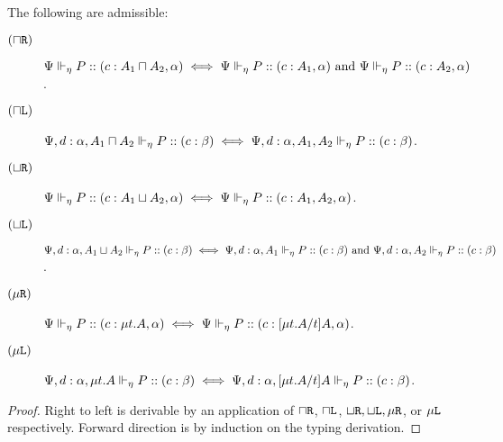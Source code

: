 \begin{lemma}[Invertibility]
  \label{algorithmic:property-invertible}
  The following are admissible:
  \begin{description}
    \item[$(\mathbin{\sqcap}\texttt{R})$] ${\Psi} \Vdash_{\eta} P :: (c : A_1 \mathbin{\sqcap} A_2, \alpha) \iff {\Psi} \Vdash_{\eta} P :: (c : A_1, \alpha) \text{ and } {\Psi} \Vdash_{\eta} P :: (c : A_2, \alpha)$.
    \item[$(\mathbin{\sqcap}\texttt{L})$] ${\Psi, d : \alpha, A_1 \mathbin{\sqcap} A_2} \Vdash_{\eta} P :: (c : \beta) \iff {\Psi, d : \alpha, A_1, A_2} \Vdash_{\eta} P :: (c : \beta)$.

    \item[$(\mathbin{\sqcup}\texttt{R})$] ${\Psi} \Vdash_{\eta} P :: (c : A_1 \mathbin{\sqcup} A_2, \alpha) \iff {\Psi} \Vdash_{\eta} P :: (c : A_1, A_2, \alpha)$.
    \item[$(\mathbin{\sqcup}\texttt{L})$] ${\Psi, d : \alpha, A_1 \mathbin{\sqcup} A_2} \Vdash_{\eta} P :: (c : \beta) \iff
    {\Psi, d : \alpha, A_1} \Vdash_{\eta} P :: (c : \beta)
    \text{ and } {\Psi, d : \alpha, A_2} \Vdash_{\eta} P :: (c : \beta)$.

    \item[$(\mu\texttt{R})$] ${\Psi} \Vdash_{\eta} P :: (c : \mu{t} . {A}, \alpha) \iff {\Psi} \Vdash_{\eta} P :: (c : \lbrack{\mu{t} . {A}}/{t}\rbrack{A}, \alpha)$.
    \item[$(\mu\texttt{L})$] ${\Psi, d : \alpha, \mu{t} . {A}} \Vdash_{\eta} P :: (c : \beta) \iff
    {\Psi, d : \alpha, \lbrack{\mu{t} . {A}}/{t}\rbrack{A}} \Vdash_{\eta} P :: (c : \beta)$.
  \end{description}
\end{lemma}
\begin{proof}
  Right to left is derivable by an application of $\mathbin{\sqcap}\texttt{R}$, $\mathbin{\sqcap}\texttt{L}$, $\mathbin{\sqcup}\texttt{R}, \mathbin{\sqcup}\texttt{L}, \mu\texttt{R}$, or $\mu\texttt{L}$ respectively. Forward direction is by induction on the typing derivation.
\end{proof}

